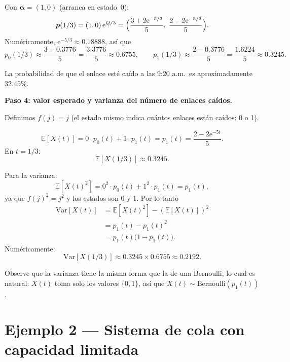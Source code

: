 \documentclass[11pt,a4paper]{article}
\theoremstyle{definition}
\theoremstyle{remark}
\newcommand{\E}{\mathbb{E}}
\newcommand{\Var}{\mathrm{Var}}
\newcommand{\e}{\mathrm{e}}
\begin{document}
\begin{ejemplo}
Con $\boldsymbol{\alpha}=(1,0)$ (arranca en estado~0):
\[
  \boldsymbol{p}(1/3) = (1,0)\,\e^{Q/3}
  = \Bigl(\frac{3+2\e^{-5/3}}{5},\;\frac{2-2\e^{-5/3}}{5}\Bigr).
\]
Numéricamente, $\e^{-5/3} \approx 0.18888$, así que
\[
  p_0(1/3) \approx \frac{3+0.3776}{5} = \frac{3.3776}{5} \approx 0.6755,
  \qquad
  p_1(1/3) \approx \frac{2-0.3776}{5} = \frac{1.6224}{5} \approx 0.3245.
\]

La probabilidad de que el enlace esté caído a las 9:20 a.m.\ es
aproximadamente $32.45\%$.

\textbf{Paso 4: valor esperado y varianza del número de enlaces caídos.}

Definimos $f(j) = j$ (el estado mismo indica cuántos enlaces están caídos:
0 o 1).

\[
  \E[X(t)] = 0\cdot p_0(t) + 1\cdot p_1(t) = p_1(t)
  = \frac{2-2\e^{-5t}}{5}.
\]
En $t=1/3$:
\[
  \E[X(1/3)] \approx 0.3245.
\]

Para la varianza:
\[
  \E[X(t)^2] = 0^2\cdot p_0(t) + 1^2\cdot p_1(t) = p_1(t),
\]
ya que $f(j)^2 = j^2$ y los estados son 0 y 1.  Por lo tanto
\begin{align*}
  \Var[X(t)] &= \E[X(t)^2] - (\E[X(t)])^2 \\
  &= p_1(t) - p_1(t)^2 \\
  &= p_1(t)\bigl(1-p_1(t)\bigr).
\end{align*}
Numéricamente:
\[
  \Var[X(1/3)] \approx 0.3245 \times 0.6755 \approx 0.2192.
\]

Observe que la varianza tiene la misma forma que la de una Bernoulli, lo
cual es natural: $X(t)$ toma solo los valores $\{0,1\}$, así que
$X(t)\sim\mathrm{Bernoulli}(p_1(t))$.
\end{ejemplo}

\section{Ejemplo 2 --- Sistema de cola con capacidad limitada}
\end{document}
